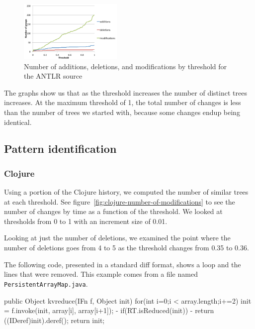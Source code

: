 \begin{figure}
\begin{center}
\includegraphics[width=0.44\textwidth]{figures/antlr-number-of-modifications.pdf}
\caption{Number of additions, deletions, and modifications by threshold for the ANTLR source}
\label{fig:antlr-number-of-modifications}
\end{center}
\end{figure}

The graphs show us that as the threshold increases the number of distinct trees
increases. At the maximum threshold of 1, the total number of changes is less
than the number of trees we started with, because some changes endup being
identical.

\subsection{Pattern identification}

\subsubsection{Clojure}
Using a portion of the Clojure history, we computed the number of similar trees
at each threshold. See figure~\ref{fig:clojure-number-of-modifications} to see
the number of changes by time as a function of the threshold. We looked at
thresholds from 0 to 1 with an increment size of 0.01.

Looking at just the number of deletions, we examined the point where the number
of deletions goes from 4 to 5 as the threshold changes from 0.35 to 0.36.

The following code, presented in a standard diff format, shows a loop and the
lines that were removed. This example comes from a file named {\tt
PersistentArrayMap.java}.

\begin{java}
 public Object kvreduce(IFn f, Object init){
     for(int i=0;i < array.length;i+=2){
         init = f.invoke(init, array[i], array[i+1]);
-           if(RT.isReduced(init))
-                   return ((IDeref)init).deref();
         }
     return init;
 }
\end{java}

